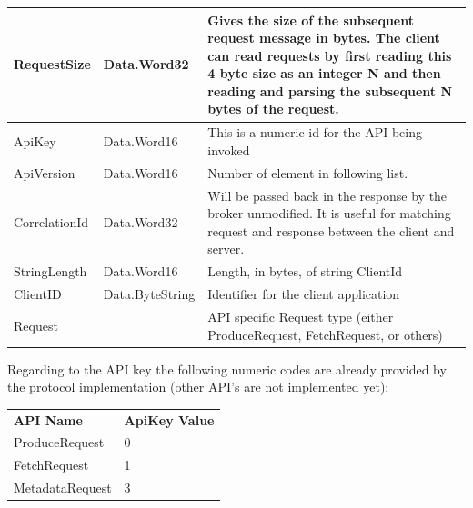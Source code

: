 \begin{table}[H]
\centering
\begin{tabular}{ l  l  p{10cm} }
\hline
RequestSize   & Data.Word32     & Gives the size of the subsequent request message in bytes. The client can read requests by first reading this 4 byte size as an integer N and then reading and parsing the subsequent N bytes of the request. \\ \hline
ApiKey        & Data.Word16     & This is a numeric id for the API being invoked                                                                                                                                                              \\ \hline
ApiVersion    & Data.Word16     & Number of element in following list.                                                                                                                                                                          \\ \hline
CorrelationId & Data.Word32     & Will be passed back in the response by the broker unmodified. It is useful for matching request and response between the client and server.                                                                   \\ \hline
StringLength  & Data.Word16     & Length, in bytes, of string ClientId                                                                                                                                                                          \\ \hline
ClientID      & Data.ByteString & Identifier for the client application                                                                                                                                                                         \\ \hline
Request       &                 & API specific Request type (either ProduceRequest, FetchRequest, or others)                                                                                                                                    \\ \hline
\end{tabular}
\end{table}

Regarding to the API key the following numeric codes are already provided by the
protocol implementation (other API's are not implemented yet): 
\begin{table}[h]
    \centering
    \begin{tabular}{ll}
        {\bf API Name}  & {\bf ApiKey Value} \\
        ProduceRequest  & 0                  \\
        FetchRequest    & 1                  \\
        MetadataRequest & 3                 
    \end{tabular}
\end{table}

